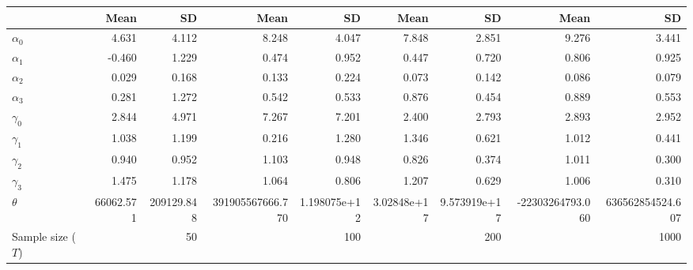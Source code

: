 
\begin{tabular}[t]{lrrrrrrrr}
\toprule
  & Mean & SD & Mean  & SD  & Mean   & SD   & Mean    & SD   \\
\midrule
$\alpha_{0}$ & 4.631 & 4.112 & 8.248 & 4.047 & 7.848 & 2.851 & 9.276 & 3.441\\
$\alpha_{1}$ & -0.460 & 1.229 & 0.474 & 0.952 & 0.447 & 0.720 & 0.806 & 0.925\\
$\alpha_{2}$ & 0.029 & 0.168 & 0.133 & 0.224 & 0.073 & 0.142 & 0.086 & 0.079\\
$\alpha_{3}$ & 0.281 & 1.272 & 0.542 & 0.533 & 0.876 & 0.454 & 0.889 & 0.553\\
$\gamma_{0}$ & 2.844 & 4.971 & 7.267 & 7.201 & 2.400 & 2.793 & 2.893 & 2.952\\
$\gamma_{1}$ & 1.038 & 1.199 & 0.216 & 1.280 & 1.346 & 0.621 & 1.012 & 0.441\\
$\gamma_{2}$ & 0.940 & 0.952 & 1.103 & 0.948 & 0.826 & 0.374 & 1.011 & 0.300\\
$\gamma_{3}$ & 1.475 & 1.178 & 1.064 & 0.806 & 1.207 & 0.629 & 1.006 & 0.310\\
$\theta$ & 66062.571 & 209129.848 & 391905567666.770 & 1.198075e+12 & 3.02848e+17 & 9.573919e+17 & -22303264793.060 & 636562854524.607\\
Sample size ($T$) &  & 50 &  & 100 &  & 200 &  & 1000\\
\bottomrule
\end{tabular}
